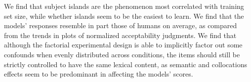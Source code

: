 We find that subject islands are the phenomenon most correlated with training set size, while whether islands seem to be the easiest to learn. %
We find that the models' responses resemble in part those of humans on average, as compared from the trends in plots of normalized acceptability judgments. We find that although the factorial experimental design is able to implicitly factor out some confounds when evenly distributed across conditions, the items should still be strictly controlled to have the same lexical content, as semantic and collocations effects seem to be predominant in affecting the models' scores.
%
%
%
%
